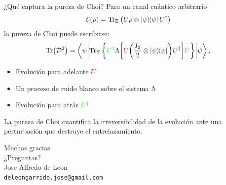 \documentclass[10pt,handout]{beamer}
\begin{document}
\begin{frame}{¿Qué captura la pureza de Choi?}
Para un canal cuántico arbitrario 
\[
\mathcal{E}(\rho) 
=
\Tr_\mathrm{E}
\qty(
U 
\rho \otimes \dyad{\psi}
U^\dagger
)
\]
la pureza de Choi puede escribirse:
\[
\Tr(\mathcal{D}^2) = 
\ev**{
\Tr_S\qty{
{\color{green} U^\dagger 
{\color{blue}\Lambda \qty[
{\color{red} U 
{\color{black} \left( \frac{I_2}{2} \otimes \dyad{\psi} \right)} 
U^\dagger}
]}
U}
}
}{\psi},
\]
\begin{itemize}
\item Evolución para adelante $\color{red} U$ 
\item Un proceso de ruido blanco sobre el sistema $\color{blue}\Lambda$
\item Evolución para atrás $\color{green}U^\dagger$
\end{itemize}
\pause
\alert{La pureza de Choi cuantifica la irreversibilidad de la evolución ante
una perturbación que destruye el entrelazamiento.}
\end{frame}

\begin{frame}[standout]
  \centering
  Muchas gracias\\
  \vspace{2cm}
  ¿Preguntas?\\
  \vspace{2cm}
  \small Jose Alfredo de Leon\\
  \texttt{deleongarrido.jose@gmail.com}\\
\end{frame}

\end{document}
